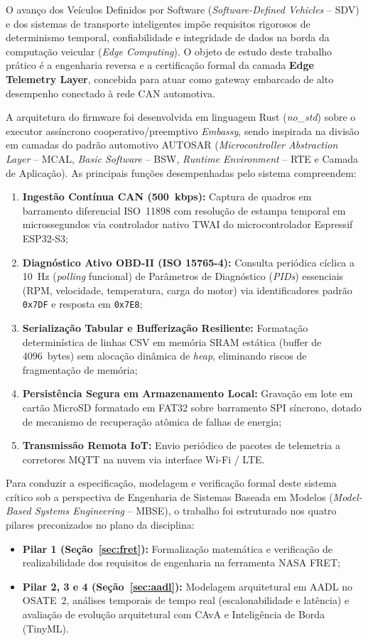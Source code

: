 O avanço dos Veículos Definidos por Software (\textit{Software-Defined Vehicles} -- SDV) e dos sistemas de transporte inteligentes impõe requisitos rigorosos de determinismo temporal, confiabilidade e integridade de dados na borda da computação veicular (\textit{Edge Computing}). O objeto de estudo deste trabalho prático é a engenharia reversa e a certificação formal da camada \textbf{Edge Telemetry Layer}, concebida para atuar como gateway embarcado de alto desempenho conectado à rede CAN automotiva.

A arquitetura do firmware foi desenvolvida em linguagem Rust (\textit{no\_std}) sobre o executor assíncrono cooperativo/preemptivo \textit{Embassy}, sendo inspirada na divisão em camadas do padrão automotivo AUTOSAR (\textit{Microcontroller Abstraction Layer} -- MCAL, \textit{Basic Software} -- BSW, \textit{Runtime Environment} -- RTE e Camada de Aplicação). As principais funções desempenhadas pelo sistema compreendem:
\begin{enumerate}
    \item \textbf{Ingestão Contínua CAN (500~kbps):} Captura de quadros em barramento diferencial ISO~11898 com resolução de estampa temporal em microssegundos via controlador nativo TWAI do microcontrolador Espressif ESP32-S3;
    \item \textbf{Diagnóstico Ativo OBD-II (ISO 15765-4):} Consulta periódica cíclica a 10~Hz (\textit{polling} funcional) de Parâmetros de Diagnóstico (\textit{PIDs}) essenciais (RPM, velocidade, temperatura, carga do motor) via identificadores padrão \texttt{0x7DF} e resposta em \texttt{0x7E8};
    \item \textbf{Serialização Tabular e Bufferização Resiliente:} Formatação determinística de linhas CSV em memória SRAM estática (buffer de 4096~bytes) sem alocação dinâmica de \textit{heap}, eliminando riscos de fragmentação de memória;
    \item \textbf{Persistência Segura em Armazenamento Local:} Gravação em lote em cartão MicroSD formatado em FAT32 sobre barramento SPI síncrono, dotado de mecanismo de recuperação atômica de falhas de energia;
    \item \textbf{Transmissão Remota IoT:} Envio periódico de pacotes de telemetria a corretores MQTT na nuvem via interface Wi-Fi / LTE.
\end{enumerate}

Para conduzir a especificação, modelagem e verificação formal deste sistema crítico sob a perspectiva de Engenharia de Sistemas Baseada em Modelos (\textit{Model-Based Systems Engineering} -- MBSE), o trabalho foi estruturado nos quatro pilares preconizados no plano da disciplina:
\begin{itemize}
    \item \textbf{Pilar 1 (Seção~\ref{sec:fret}):} Formalização matemática e verificação de realizabilidade dos requisitos de engenharia na ferramenta NASA FRET;
    \item \textbf{Pilar 2, 3 e 4 (Seção~\ref{sec:aadl}):} Modelagem arquitetural em AADL no OSATE~2, análises temporais de tempo real (escalonabilidade e latência) e avaliação de evolução arquitetural com CAvA e Inteligência de Borda (TinyML).
\end{itemize}
